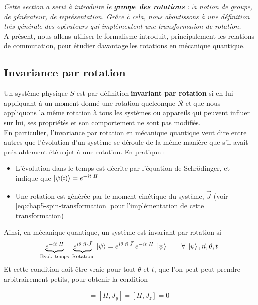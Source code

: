 \documentclass[../notesdecours.tex]{subfiles}
\begin{document}
\begin{leftbar}
    \textit{Cette section a servi à introduire le \textbf{groupe des rotations} : la notion de groupe, de générateur, de représentation. Grâce à cela, nous aboutissons à une définition très générale des opérateurs qui implémentent une transformation de rotation.} \\

    A présent, nous allons utiliser le formalisme introduit, principalement les relations de commutation, pour étudier davantage les rotations en mécanique quantique.
\end{leftbar}
\subsection{Invariance par rotation}
Un système physique $S$ est par définition \textbf{invariant par rotation} si en lui appliquant à un moment donné une rotation quelconque $\mathcal{R}$ et que nous appliquons la même rotation à tous les systèmes ou appareils qui peuvent influer sur lui, ses propriétés et son comportement ne sont pas modifiés. \\

En particulier, l'invariance par rotation en mécanique quantique veut dire entre autres que l'évolution d'un système se déroule de la même manière que s'il avait préalablement été sujet à une rotation. En pratique :
\begin{itemize}
    \item L'évolution dans le temps est décrite par l'équation de Schrödinger, et indique que $\ket{\psi(t)} = e^{-it \; H}$
    \item Une rotation est générée par le moment cinétique du système, $\vec J$ (voir \eqref{eq:chap5-spin-transformation} pour l'implémentation de cette transformation)
\end{itemize}

Ainsi, en mécanique quantique, un système est invariant par rotation si 
$$
\underbrace{e^{-it\; H}}_{\text{Evol. temps}} \; 
\underbrace{e^{i\theta \; \vec n\cdot \vec J}}_{\text{Rotation}} \; 
\ket \psi = 
e^{i\theta \; \vec n\cdot \vec J}\; 
e^{-it\; H} \; 
 \ket \psi 
 \qquad \forall\;  \ket \psi , \vec n, \theta, t
$$
Et cette condition doit être vraie pour tout $\theta$ et $t$, que l'on peut peut prendre arbitrairement petits, pour obtenir la condition 

\begin{equation}
    [H, J_x] = [H, J_y] = [H, J_z] = 0
\end{equation}
{\color{red}{Je ne suis pas sûr du calcul qui mène à cela. J'arrive à $[H, J_x] + [H, J_y] + [H, J_z] =0$ et je ne vois pas comment affirmer la condition ci-dessus}}
\end{document}
